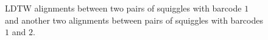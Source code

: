 \begin{figure}[ht]
\caption[LDTW alignments between two pairs of squiggles]{LDTW alignments between two pairs of squiggles with barcode $1$ and another two alignments between pairs of squiggles with barcodes $1$ and $2$.} \label{fig:LDTW_alignments}
\end{figure}